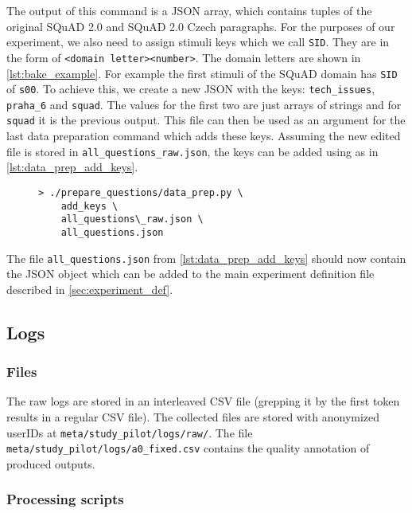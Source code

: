 The output of this command is a JSON array, which contains tuples of the original SQuAD 2.0 and SQuAD 2.0 Czech paragraphs. For the purposes of our experiment, we also need to assign stimuli keys which we call \texttt{SID}. They are in the form of \texttt{<domain letter><number>}. The domain letters are shown in \cref{lst:bake_example}. For example the first stimuli of the SQuAD domain has \texttt{SID} of \texttt{s00}. To achieve this, we create a new JSON with the keys: \texttt{tech\_issues}, \texttt{praha\_6} and \texttt{squad}. The values for the first two are just arrays of strings and for \texttt{squad} it is the previous output. This file can then be used as an argument for the last data preparation command which adds these keys. Assuming the new edited file is stored in \texttt{all\_questions\_raw.json}, the keys can be added using as in \cref{lst:data_prep_add_keys}.

\begin{figure}[h]
\begin{lstlisting}[language=none,caption={Usage of data preparation tool command which adds \texttt{SID}s to stimuli}, label={lst:data_prep_add_keys}]
> ./prepare_questions/data_prep.py \ 
    add_keys \
    all_questions\_raw.json \
    all_questions.json
\end{lstlisting}
\end{figure}

The file \texttt{all\_questions.json} from \cref{lst:data_prep_add_keys} should now contain the JSON object which can be added to the main experiment definition file described in \cref{sec:experiment_def}.

\subsection{Logs} \label{sec:dev_doc:log_eval}

\subsubsection{Files}

The raw logs are stored in an interleaved CSV file (grepping it by the first token results in a regular CSV file). The collected files are stored with anonymized userIDs at \texttt{meta/study\_pilot/logs/raw/}. The file \texttt{meta/study\_pilot/logs/a0\_fixed.csv} contains the quality annotation of produced outputs.

\subsubsection*{Processing scripts}

